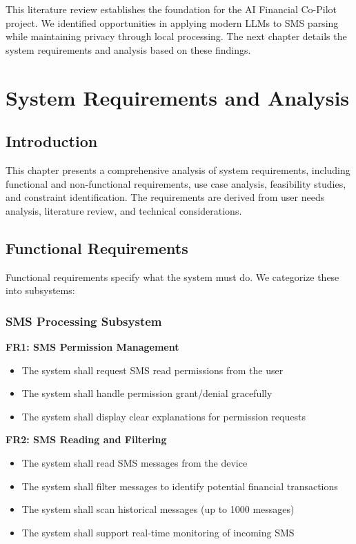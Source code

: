 \documentclass[11pt,a4paper]{report}
\begin{document}
This literature review establishes the foundation for the AI Financial Co-Pilot project. We identified opportunities in applying modern LLMs to SMS parsing while maintaining privacy through local processing. The next chapter details the system requirements and analysis based on these findings.

\chapter{System Requirements and Analysis}

\section{Introduction}

This chapter presents a comprehensive analysis of system requirements, including functional and non-functional requirements, use case analysis, feasibility studies, and constraint identification. The requirements are derived from user needs analysis, literature review, and technical considerations.

\section{Functional Requirements}

Functional requirements specify what the system must do. We categorize these into subsystems:

\subsection{SMS Processing Subsystem}

\textbf{FR1: SMS Permission Management}
\begin{itemize}
    \item The system shall request SMS read permissions from the user
    \item The system shall handle permission grant/denial gracefully
    \item The system shall display clear explanations for permission requests
\end{itemize}

\textbf{FR2: SMS Reading and Filtering}
\begin{itemize}
    \item The system shall read SMS messages from the device
    \item The system shall filter messages to identify potential financial transactions
    \item The system shall scan historical messages (up to 1000 messages)
    \item The system shall support real-time monitoring of incoming SMS
\end{itemize}
\end{document}
